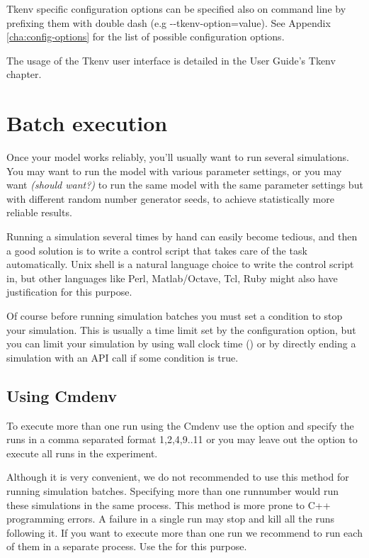 Tkenv specific configuration options can be specified also on command line
by prefixing them with double dash (e.g -{}-tkenv-option=value). See
Appendix \ref{cha:config-options} for the list of possible configuration options.

\begin{note}
The usage of the Tkenv user interface is detailed in the {\opp}  User Guide's Tkenv
chapter.
\end{note}

\section{Batch execution}
\label{sec:ch-run-sim:batch-execution}

Once your model works reliably, you'll usually want to run several
simulations. You may want to run the model with various
parameter settings, or you may want \textit{(should want?)} to
run the same model with the same parameter settings but with
different random number generator seeds, to achieve statistically
more reliable results.

Running a simulation several times by hand can easily become tedious,
and then a good solution is to write a control script that
takes care of the task automatically. Unix shell is
a natural language choice to write the control script in,
but other languages like Perl, Matlab/Octave, Tcl, Ruby might also have
justification for this purpose.

Of course before running simulation batches you must set a condition to
stop your simulation. This is usually a time limit set by the
 configuration option, but you can limit your simulation
by using wall clock time () or by directly ending a
simulation with an API call if some condition is true.

\subsection{Using Cmdenv}

  To execute more than one run using the Cmdenv use the  option
  and specify the runs in a comma separated format 1,2,4,9..11 or you may leave
  out the  option to execute all runs in the experiment.

\begin{warning}
  Although it is very convenient, we do not recommended to use this method for
  running simulation batches. Specifying more than one runnumber
  would run these simulations in the same process. This method is more prone to C++ programming
  errors. A failure in a single run may stop and kill all the runs following it. If you want
  to execute more than one run we recommend to run each of them in a separate process.
  Use the  for this purpose.
\end{warning}



